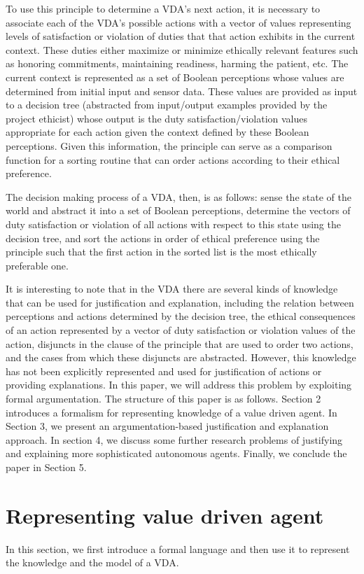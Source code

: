 \documentclass[letterpaper]{article} %
\begin{document}
To use this principle to determine a VDA's next action, it is necessary to associate each of the VDA's possible actions with a vector of values representing levels of satisfaction or violation of duties that that action exhibits in the current context. These duties either maximize or minimize ethically relevant features such as honoring commitments, maintaining readiness, harming the patient, etc.   The current context is represented as a set of Boolean perceptions whose values are determined from initial input and sensor data. These values are provided as input to a decision tree (abstracted from input/output examples provided by the project ethicist) whose output is the duty satisfaction/violation values appropriate for each action given the context defined by these Boolean perceptions. Given this information, the principle can serve as a comparison function for a sorting routine that can order actions according to their ethical preference.

The decision making process of a VDA, then, is as follows:  sense the state of the world and abstract it into a set of Boolean perceptions, determine the vectors of duty satisfaction or violation of all actions with respect to this state using the decision tree, and sort the actions in order of ethical preference using the principle such that the first action in the sorted list is the most ethically preferable one.

It is interesting to note that in the VDA there are several kinds of knowledge that can be used for justification and explanation, including the relation between perceptions and actions determined by the decision tree, the ethical consequences of an action represented by a vector of duty satisfaction or violation values of the action,  disjuncts in the clause of the principle that are used to order two actions, and the cases from which these disjuncts are abstracted. However, this knowledge has not been explicitly represented and used for justification of actions or providing explanations. In this paper, we will address this problem by exploiting formal argumentation. 
The structure of this paper is as follows. Section 2 introduces a formalism for representing knowledge of a value driven agent. In Section 3, we present an argumentation-based justification and explanation approach. In section 4, we discuss some further research problems of justifying and explaining more sophisticated autonomous agents. Finally, we conclude the paper in Section 5. 


\section{Representing value driven agent}
In this section, we first introduce a formal language and then use it to represent the knowledge and the model of a VDA. 
\end{document}
